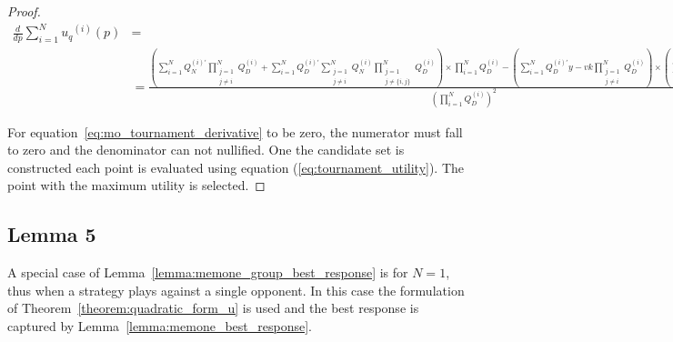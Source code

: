 \begin{proof}
    {\scriptsize
    \begin{align}\label{eq:mo_tournament_derivative}
        \frac{d}{dp} \sum\limits_{i=1} ^ {N} {u_q}^{(i)} (p) & = \nonumber \\
        & =\frac{
        (\sum\limits_{i=1} ^ {N} Q_{N}^{(i)'} \prod_{\substack{j=1 \\ j \neq i}} ^ N Q_{D}^{(i)}
        + \sum\limits_{i=1} ^ {N} Q_{D}^{(i)'} \sum_{\substack{j=1 \\ j \neq i}} ^ {N} Q_{N}^{(i)}
       \prod_{\substack{j=1 \\ j \neq \{i, j\}}} ^ N Q_{D}^{(i)}) \times
       \prod\limits_{i=1} ^ N Q_{D}^{(i)} - (\sum\limits_{i=1} ^ {N} Q_{D}^{(i)'}y-vk
       \prod_{\substack{j=1 \\ j \neq i}} ^ N Q_{D}^{(i)}) \times
       (\sum\limits_{i=1} ^ {N} Q_{N}^{(i)} \prod_{\substack{j=1 \\ j \neq i}} ^ N Q_{D}^{(i)})}
        {(\prod\limits_{i=1} ^ N Q_{D}^{(i)})^{2}}
    \end{align}
    }

    For equation~\ref{eq:mo_tournament_derivative} to be zero, the numerator
    must fall to zero and the denominator can not nullified. One the candidate
    set is constructed each point is evaluated using equation
    (\ref{eq:tournament_utility}). The point with the maximum utility is
    selected.
\end{proof}


\subsection{Lemma 5}

A special case of Lemma~\ref{lemma:memone_group_best_response} is for \(N=1\),
thus when a strategy plays against a single opponent. In this case the formulation
of Theorem~\ref{theorem:quadratic_form_u} is used and the best response is captured
by Lemma~\ref{lemma:memone_best_response}.


